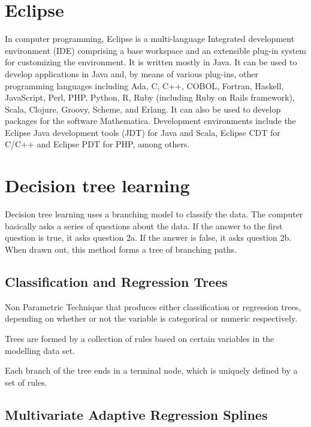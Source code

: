 \documentclass[11pt]{article} %
\begin{document}
\section{Eclipse}
In computer programming, Eclipse is a multi-language Integrated development environment (IDE) comprising a base workspace and an extensible plug-in system for customizing the environment. It is written mostly in Java. It can be used to develop applications in Java and, by means of various plug-ins, other programming languages including Ada, C, C++, COBOL, Fortran, Haskell, JavaScript, Perl, PHP, Python, R, Ruby (including Ruby on Rails framework), Scala, Clojure, Groovy, Scheme, and Erlang. It can also be used to develop packages for the software Mathematica. Development environments include the Eclipse Java development tools (JDT) for Java and Scala, Eclipse CDT for C/C++ and Eclipse PDT for PHP, among others.



\section{Decision tree learning}

Decision tree learning uses a branching model to classify the data. The computer basically asks a series of questions about the data. If the answer to the first question is true, it asks question 2a. If the answer is false, it asks question 2b. When drawn out, this method forms a tree of branching paths.







\subsection*{Classification and Regression Trees}

Non Parametric Technique that produces either classification or regression trees, depending on whether or not the variable is categorical or numeric respectively.

Trees are formed by a collection of rules based on certain variables in the modelling data set.

Each branch of the tree ends in a terminal node, which is uniquely defined by a set of rules.



\subsection*{Multivariate Adaptive Regression Splines}
\end{document}

